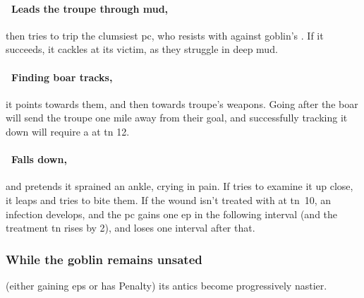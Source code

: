 \documentclass[10pt,twoside]{book}
\begin{document}
\paragraph{\Square~Leads the troupe through mud,}
then tries to trip the clumsiest \gls{pc}, who resists with  against goblin's .
If it succeeds, it cackles at its victim, as they struggle in deep mud.


\boar

\paragraph{\Square~Finding boar tracks,}
it points towards them, and then towards troupe's \glspl{weapon}.
Going after the boar will send the troupe one mile away from their goal, and successfully tracking it down will require a  at \gls{tn} 12.

\paragraph{\Square~Falls down,}
and pretends it sprained an ankle, crying in pain.
If  tries to examine it up close, it leaps and tries to bite them.
If the wound isn't treated with  at \gls{tn}~10, an infection develops, and the \gls{pc} gains one \gls{ep} in the following \gls{interval} (and the treatment \gls{tn} rises by 2), and loses  one \gls{interval} after that.

\subsubsection{While the goblin remains unsated}
(either gaining \glspl{ep} or has  Penalty)
its antics become progressively nastier.
\end{document}
